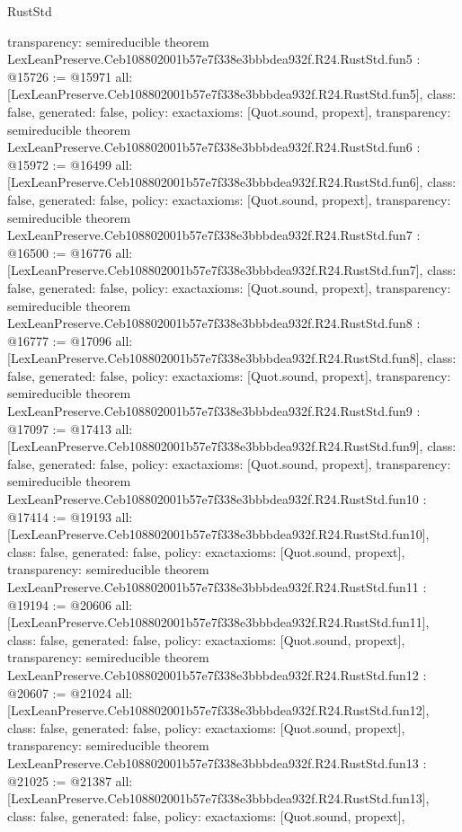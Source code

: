 \begin{lexlean}{RustStd}
\begin{coremodule}
{  transparency: semireducible
}
theorem LexLeanPreserve.Ceb108802001b57e7f338e3bbbdea932f.R24.RustStd.fun5 : @15726 := @15971 {
  all: [LexLeanPreserve.Ceb108802001b57e7f338e3bbbdea932f.R24.RustStd.fun5],
  class: false,
  generated: false,
  policy: exact{axioms: [Quot.sound, propext]},
  transparency: semireducible
}
theorem LexLeanPreserve.Ceb108802001b57e7f338e3bbbdea932f.R24.RustStd.fun6 : @15972 := @16499 {
  all: [LexLeanPreserve.Ceb108802001b57e7f338e3bbbdea932f.R24.RustStd.fun6],
  class: false,
  generated: false,
  policy: exact{axioms: [Quot.sound, propext]},
  transparency: semireducible
}
theorem LexLeanPreserve.Ceb108802001b57e7f338e3bbbdea932f.R24.RustStd.fun7 : @16500 := @16776 {
  all: [LexLeanPreserve.Ceb108802001b57e7f338e3bbbdea932f.R24.RustStd.fun7],
  class: false,
  generated: false,
  policy: exact{axioms: [Quot.sound, propext]},
  transparency: semireducible
}
theorem LexLeanPreserve.Ceb108802001b57e7f338e3bbbdea932f.R24.RustStd.fun8 : @16777 := @17096 {
  all: [LexLeanPreserve.Ceb108802001b57e7f338e3bbbdea932f.R24.RustStd.fun8],
  class: false,
  generated: false,
  policy: exact{axioms: [Quot.sound, propext]},
  transparency: semireducible
}
theorem LexLeanPreserve.Ceb108802001b57e7f338e3bbbdea932f.R24.RustStd.fun9 : @17097 := @17413 {
  all: [LexLeanPreserve.Ceb108802001b57e7f338e3bbbdea932f.R24.RustStd.fun9],
  class: false,
  generated: false,
  policy: exact{axioms: [Quot.sound, propext]},
  transparency: semireducible
}
theorem LexLeanPreserve.Ceb108802001b57e7f338e3bbbdea932f.R24.RustStd.fun10 : @17414 := @19193 {
  all: [LexLeanPreserve.Ceb108802001b57e7f338e3bbbdea932f.R24.RustStd.fun10],
  class: false,
  generated: false,
  policy: exact{axioms: [Quot.sound, propext]},
  transparency: semireducible
}
theorem LexLeanPreserve.Ceb108802001b57e7f338e3bbbdea932f.R24.RustStd.fun11 : @19194 := @20606 {
  all: [LexLeanPreserve.Ceb108802001b57e7f338e3bbbdea932f.R24.RustStd.fun11],
  class: false,
  generated: false,
  policy: exact{axioms: [Quot.sound, propext]},
  transparency: semireducible
}
theorem LexLeanPreserve.Ceb108802001b57e7f338e3bbbdea932f.R24.RustStd.fun12 : @20607 := @21024 {
  all: [LexLeanPreserve.Ceb108802001b57e7f338e3bbbdea932f.R24.RustStd.fun12],
  class: false,
  generated: false,
  policy: exact{axioms: [Quot.sound, propext]},
  transparency: semireducible
}
theorem LexLeanPreserve.Ceb108802001b57e7f338e3bbbdea932f.R24.RustStd.fun13 : @21025 := @21387 {
  all: [LexLeanPreserve.Ceb108802001b57e7f338e3bbbdea932f.R24.RustStd.fun13],
  class: false,
  generated: false,
  policy: exact{axioms: [Quot.sound, propext]},
}
\end{coremodule}
\end{lexlean}
